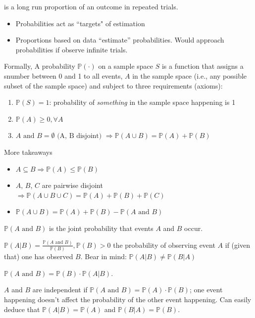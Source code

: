 \documentclass[10pt,landscape]{article}
\newcommand{\Red}[1]{\noindent{\textbf{\textcolor{BrickRed}{#1 -}}}}
\newcommand{\Green}[1]{\noindent{\textbf{\textcolor{PineGreen}{#1 -}}}}
\begin{document}
\begin{multicols}{4}
\Red{Probability} is a long run proportion of an outcome in repeated trials.
\begin{itemize}
    \item Probabilities act as ``targets" of estimation
    \item Proportions based on data ``estimate'' probabilities. Would approach probabilities if observe infinite trials.
\end{itemize}
Formally, 
A probability $\mathbb{P}(\cdot)$ on a sample space $S$ is a function that assigns a snumber between 0 and 1 to all
events, $A$ in the sample space (i.e., any possible subset of the sample space) and subject to three requirements
(axioms):
\begin{enumerate}
    \item $\mathbb{P}(S) = 1$: probability of \textit{something} in the sample space happening is 1
    \item $\mathbb{P}(A) \ge 0, \forall A$
    \item $A \text{ and } B = \emptyset \text{ (A, B disjoint) } \Rightarrow \mathbb{P}(A \cup B) = \mathbb{P}(A) + \mathbb{P}(B)$
\end{enumerate}

More takeaways
\begin{itemize}
    \item $A \subseteq B \Rightarrow \mathbb{P}(A) \le \mathbb{P}(B)$
    \item $A$, $B$, $C$ are pairwise disjoint $\Rightarrow \mathbb{P}(A \cup B \cup C) = \mathbb{P}(A) + \mathbb{P}(B) + \mathbb{P}(C)$
    \item $\mathbb{P}(A \cup B) = \mathbb{P}(A) + \mathbb{P}(B) - \mathbb{P}(A \text{ and } B)$
\end{itemize}

\Red{Joint Probability} $\mathbb{P}(A \text{ and } B)$ is the joint probability that events $A$ and $B$ occur.

\Red{Conditional Probability} $\mathbb{P}(A | B) = \frac{\mathbb{P}(A \text{ and } B)}{\mathbb{P}(B)}, \mathbb{P}(B) > 0$ the
probability of observing event $A$ if (given that) one has observed $B$. Bear in mind: $\mathbb{P}(A | B) \neq \mathbb{P}(B | A)$

\Green{Product Rule} $\mathbb{P}(A \text{ and } B) = \mathbb{P}(B) \cdot \mathbb{P}(A | B)$.

\Red{Independent Events} $A$ and $B$ are independent if $\mathbb{P}(A \text{ and } B) = \mathbb{P}(A) \cdot \mathbb{P}(B)$; one
event happening doesn't affect the probability of the other event happening. Can easily deduce that
$\mathbb{P}(A | B) = \mathbb{P}(A)$ and $\mathbb{P}(B | A) = \mathbb{P}(B)$.


\end{multicols}
\end{document}
